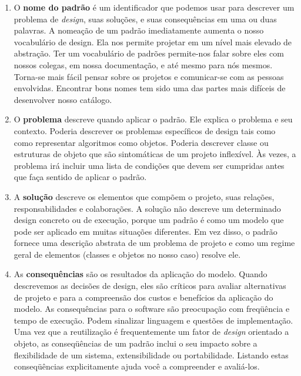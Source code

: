 \begin{enumerate}
	\item 

O \textbf{nome do padrão} é um identificador que podemos usar para descrever um problema de \emph{design}, suas
soluções, e suas consequências em uma ou duas palavras. A nomeação de um padrão imediatamente
aumenta o nosso vocabulário de design. Ela nos permite projetar em um nível mais elevado de
abstração. Ter um vocabulário de padrões permite-nos falar sobre eles com
nossos colegas, em nossa documentação, e até mesmo para nós mesmos. Torna-se
mais fácil pensar sobre os projetos e comunicar-se com as pessoas envolvidas. Encontrar bons nomes tem sido uma das partes mais difíceis de desenvolver nosso catálogo.

	\item 


O \textbf{problema} descreve quando aplicar o padrão. Ele explica o problema
e seu contexto. Poderia descrever os problemas específicos de design tais como
como representar algoritmos como objetos. Poderia descrever classe ou
estruturas de objeto que são sintomáticas de um projeto inflexível. Às vezes, a
problema irá incluir uma lista de condições que devem ser cumpridas antes que faça
sentido de aplicar o padrão.


	\item 


A \textbf{solução} descreve os elementos que compõem o projeto, suas
relações, responsabilidades e colaborações. A solução não
descreve um determinado design concreto ou de execução, porque um padrão
é como um modelo que pode ser aplicado em muitas situações diferentes. Em vez disso,
o padrão fornece uma descrição abstrata de um problema de projeto e como
um regime geral de elementos (classes e objetos no nosso caso) resolve
ele.

	\item 


As \textbf{consequências} são os resultados da aplicação do modelo.
Quando descrevemos as decisões de design, eles são críticos para avaliar alternativas de projeto e para a compreensão
dos custos e benefícios da aplicação do modelo. As consequências para o
software são preocupação com freqüência e tempo de execução. Podem sinalizar linguagem
e questões de implementação. Uma vez que a reutilização é frequentemente um fator de
\emph{design} orientado a objeto, as conseqüências de um padrão inclui o seu impacto
sobre a flexibilidade de um sistema, extensibilidade ou portabilidade. Listando estas
conseqüências explicitamente ajuda você a compreender e avaliá-los.


\end{enumerate}

